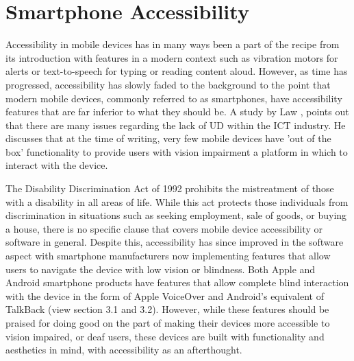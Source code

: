 
\section{Smartphone Accessibility}
Accessibility in mobile devices has in many ways been a part of the recipe from its introduction with features in a modern context such as vibration motors for alerts or text-to-speech for typing or reading content aloud.
However, as time has progressed, accessibility has slowly faded to the background to the point that modern mobile devices, commonly referred to as smartphones, have accessibility features that are far inferior to what they should be. %
A study by Law \cite{cellphone}, points out that there are many issues regarding the lack of UD within the ICT industry. %
He discusses that at the time of writing, very few mobile devices have 'out of the box' functionality to provide users with vision impairment a platform in which to interact with the device. %

The Disability Discrimination Act of 1992 \cite{dda1992} prohibits the mistreatment of those with a disability in all areas of life.
While this act protects those individuals from discrimination in situations such as seeking employment, sale of goods, or buying a house, there is no specific clause that covers mobile device accessibility or software in general.
Despite this, accessibility has since improved in the software aspect with smartphone manufacturers now implementing features that allow users to navigate the device with low vision or blindness.
Both Apple and Android smartphone products have features that allow complete blind interaction with the device in the form of Apple VoiceOver \cite{iphone} and Android's equivalent of TalkBack \cite{android} (view section 3.1 and 3.2).
However, while these features should be praised for doing good on the part of making their devices more accessible to vision impaired, or deaf users, these devices are built with functionality and aesthetics in mind, with accessibility as an afterthought.

